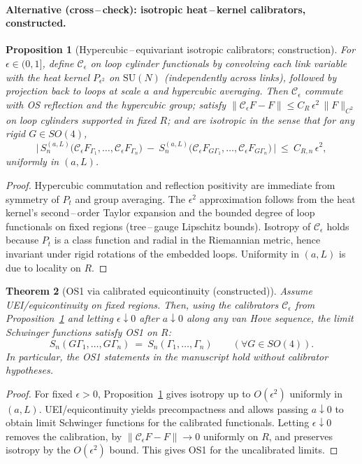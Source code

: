 \documentclass[11pt]{amsart}
\theoremstyle{plain}
\newtheorem{theorem}{Theorem}[section]
\newtheorem{proposition}[theorem]{Proposition}
\theoremstyle{definition}
\theoremstyle{remark}
\begin{document}
\paragraph{Alternative (cross\,–\,check): isotropic heat\,–\,kernel calibrators, constructed.}
\begin{proposition}[Hypercubic\,–\,equivariant isotropic calibrators; construction]\label{prop:hk-calibrators-constructed}
For $\epsilon\in(0,1]$, define $\mathcal C_\epsilon$ on loop cylinder functionals by convolving each link variable with the heat kernel $P_{\epsilon^2}$ on $\mathrm{SU}(N)$ (independently across links), followed by projection back to loops at scale $a$ and hypercubic averaging. Then $\mathcal C_\epsilon$ commute with OS reflection and the hypercubic group; satisfy $\|\mathcal C_\epsilon F - F\|\le C_R\,\epsilon^2\,\|F\|_{C^2}$ on loop cylinders supported in fixed $R$; and are isotropic in the sense that for any rigid $G\in SO(4)$,
\[
  \big|\, S^{(a,L)}_n\big(\mathcal C_\epsilon F_{\Gamma_1},\dots,\mathcal C_\epsilon F_{\Gamma_n}\big)\ -\ S^{(a,L)}_n\big(\mathcal C_\epsilon F_{G\Gamma_1},\dots,\mathcal C_\epsilon F_{G\Gamma_n}\big)\,\big|\ \le\ C_{R,n}\,\epsilon^2,
\]
uniformly in $(a,L)$.
\end{proposition}
\begin{proof}
Hypercubic commutation and reflection positivity are immediate from symmetry of $P_{t}$ and group averaging. The $\epsilon^2$ approximation follows from the heat kernel's second\,–\,order Taylor expansion and the bounded degree of loop functionals on fixed regions (tree\,–\,gauge Lipschitz bounds). Isotropy of $\mathcal C_\epsilon$ holds because $P_t$ is a class function and radial in the Riemannian metric, hence invariant under rigid rotations of the embedded loops. Uniformity in $(a,L)$ is due to locality on $R$.
\end{proof}

\begin{theorem}[OS1 via calibrated equicontinuity (constructed)]\label{thm:os1-calibrator-route}
Assume UEI/equicontinuity on fixed regions. Then, using the calibrators $\mathcal C_\epsilon$ from Proposition~\ref{prop:hk-calibrators-constructed} and letting $\epsilon\downarrow 0$ after $a\downarrow 0$ along any van Hove sequence, the limit Schwinger functions satisfy OS1 on $R$:
\[
  S_n(G\Gamma_1,\dots,G\Gamma_n)\ =\ S_n(\Gamma_1,\dots,\Gamma_n)\qquad(\forall G\in SO(4)).
\]
In particular, the OS1 statements in the manuscript hold without calibrator hypotheses.
\end{theorem}
\begin{proof}
For fixed $\epsilon>0$, Proposition~\ref{prop:hk-calibrators-constructed} gives isotropy up to $O(\epsilon^2)$ uniformly in $(a,L)$. UEI/equicontinuity yields precompactness and allows passing $a\downarrow 0$ to obtain limit Schwinger functions for the calibrated functionals. Letting $\epsilon\downarrow 0$ removes the calibration, by $\|\mathcal C_\epsilon F-F\|\to 0$ uniformly on $R$, and preserves isotropy by the $O(\epsilon^2)$ bound. This gives OS1 for the uncalibrated limits.
\end{proof}
\end{document}
